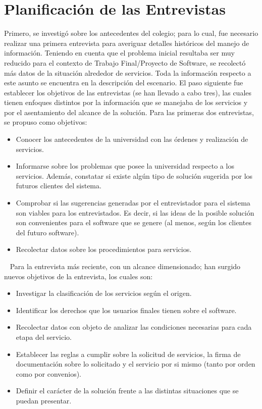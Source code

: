 \section[Entrevistas]{Planificaci\'on de las Entrevistas}
\normalsize{ \indent
Primero, se investig\'o sobre los antecedentes del colegio;
para lo cual, fue necesario realizar una primera entrevista
para averiguar detalles hist\'oricos del manejo de
informaci\'on. Teniendo en cuenta que el problema inicial
resultaba ser muy reducido para el contexto de Trabajo
Final/Proyecto de Software, se recolect\'o m\'as datos de
la situaci\'on alrededor de servicios. Toda la informaci\'on
respecto a este asunto se encuentra en la descripci\'on del
escenario.
}
\newline
\normalsize{ \indent
El paso siguiente fue establecer los objetivos de las
entrevistas (se han llevado a cabo tres), las cuales tienen
enfoques distintos por la informaci\'on que se manejaba de
los servicios y por el asentamiento del alcance de la
soluci\'on. Para las primeras dos entrevistas, se propuso
como objetivos: 
}
\begin{itemize}
	\item Conocer los antecedentes de la universidad con las
	\'ordenes y realizaci\'on de servicios.
	\item Informarse sobre los problemas que posee la
	universidad respecto a los servicios. Adem\'as, constatar
	si existe alg\'un tipo de soluci\'on sugerida por los
	futuros clientes del sistema.
	\item Comprobar si las sugerencias generadas por el
	entrevistador para el sistema son viables para los
	entrevistados. Es decir, si las ideas de la posible
	soluci\'on son convenientes para el software que se
	genere (al menos, seg\'un los clientes del futuro software).
	\item Recolectar datos sobre los procedimientos para
	servicios.
\end{itemize}
\ \newline
\normalsize{ \indent
Para la entrevista m\'as reciente, con un alcance dimensionado;
han surgido nuevos objetivos de la entrevista, los cuales son:
}
\begin{itemize}
	\item Investigar la clasificaci\'on de los servicios seg\'un
	el origen.
	\item Identificar los derechos que los usuarios finales tienen
	sobre el software.
	\item Recolectar datos con objeto de analizar las condiciones
	necesarias para cada etapa del servicio.
	\item Establecer las reglas a cumplir sobre la solicitud de
	servicios, la firma de documentaci\'on sobre lo solicitado y
	el servicio por si mismo (tanto por orden como por convenios).
	\item Definir el car\'acter de la soluci\'on frente a las
	distintas situaciones que se puedan presentar.
\end{itemize}

